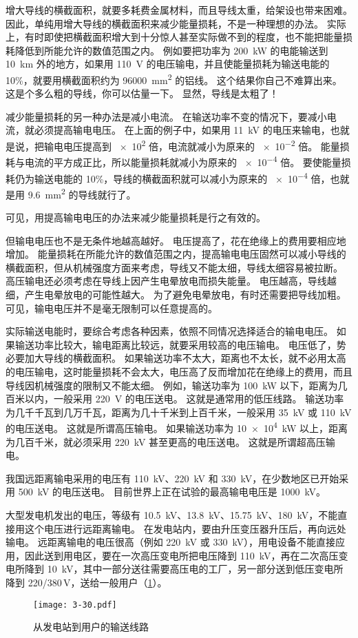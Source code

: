 增大导线的横截面积，就要多耗费金属材料，而且导线太重，给架设也带来困难。
因此，单纯用增大导线的横截面积来减少能量损耗，不是一种理想的办法。
实际上，有时即使把横截面积增大到十分惊人甚至实际做不到的程度，也不能把能量损耗降低到所能允许的数值范围之内。
例如要把功率为 \qty{200}{kW} 的电能输送到 \qty{10}{km} 外的地方，如果用 \qty{110}{V} 的电压输电，并且使能量损耗为输送电能的 10\%，就要用横截面积约为 \qty{96000}{mm^2} 的铝线。
这个结果你自己不难算出来。
这是个多么粗的导线，你可以估量一下。
显然，导线是太粗了！

减少能量损耗的另一种办法是减小电流。
在输送功率不变的情况下，要减小电流，就必须提高输电电压。
在上面的例子中，如果用 \qty{11}{kV} 的电压来输电，也就是说，把输电电压提高到 \num{e2} 倍，电流就减小为原来的 \num{e-2} 倍。
能量损耗与电流的平方成正比，所以能量损耗就减小为原来的 \num{e-4} 倍。
要使能量损耗仍为输送电能的 10\%，导线的横截面积就可以减小为原来的 \num{e-4} 倍，也就是用 \qty{9.6}{mm^2} 的导线就行了。

可见，用提高输电电压的办法来减少能量损耗是行之有效的。

但输电电压也不是无条件地越高越好。
电压提高了，花在绝缘上的费用要相应地增加。
能量损耗在所能允许的数值范围之内，提高输电电压固然可以减小导线的横截面积，但从机械强度方面来考虑，导线又不能太细，导线太细容易被拉断。
高压输电还必须考虑在导线上因产生电晕放电而损失能量。
电压越高，导线越细，产生电晕放电的可能性越大。
为了避免电晕放电，有时还需要把导线加粗。
可见，输电电压并不是毫无限制可以任意提高的。

实际输送电能时，要综合考虑各种因素，依照不同情况选择适合的输电电压。
如果输送功率比较大，输电距离比较远，就要采用较高的电压输电。
电压低了，势必要加大导线的横截面积。
如果输送功率不太大，距离也不太长，就不必用太高的电压输电，这时能量损耗不会太大，电压高了反而增加花在绝缘上的费用，而且导线因机械强度的限制又不能太细。
例如，输送功率为 \qty{100}{kW} 以下，距离为几百米以内，一般采用 \qty{220}{V} 的电压送电。
这就是通常用的低压线路。
输送功率为几千千瓦到几万千瓦，距离为几十千米到上百千米，一般采用 \qty{35}{kV} 或 \qty{110}{kV} 的电压送电。
这就是所谓高压输电。
如果输送功率为 \qty{10e4}{kW} 以上，距离为几百千米，就必须采用 \qty{220}{kV} 甚至更高的电压送电。
这就是所谓超高压输电。

我国远距离输电采用的电压有 \qty{110}{kV}、\qty{220}{kV} 和 \qty{330}{kV}，在少数地区已开始采用 \qty{500}{kV} 的电压送电。
目前世界上正在试验的最高输电电压是 \qty{1000}{kV}。

大型发电机发出的电压，等级有 \qty{10.5}{kV}、\qty{13.8}{kV}、\qty{15.75}{kV}、\qty{180}{kV}，不能直接用这个电压进行远距离输电。
在发电站内，要由升压变压器升压后，再向远处输电。
远距离输电的电压很高（例如 \qty{220}{kV} 或 \qty{330}{kV}），用电设备不能直接应用，因此送到用电区，要在一次高压变电所把电压降到 \qty{110}{kV}，再在二次高压变电所降到 \qty{10}{kV}，其中一部分送往需要高压电的工厂，另一部分送到低压变电所降到 220/380\,\unit{V}，送给一般用户（\cref{fig:3-30}）。
\begin{figure}
  \texttt{[image: 3-30.pdf]}
  \caption{从发电站到用户的输送线路}\label{fig:3-30}
\end{figure}

